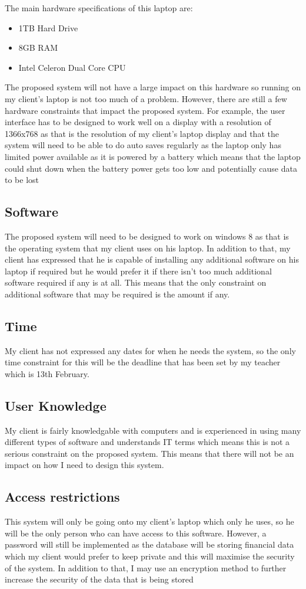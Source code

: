 The main hardware specifications of this laptop are:
\begin{itemize}
	\item 1TB Hard Drive
	\item 8GB RAM
	\item Intel Celeron Dual Core CPU
\end{itemize}
The proposed system will not have a large impact on this hardware so running on my client's laptop is not too much of a problem.
However, there are still a few hardware constraints that impact the proposed system. For example, the user interface has to be designed to work well on a display with a resolution of 1366x768 as that is the resolution of my client's laptop display and that the system will need to be able to do auto saves regularly as the laptop only has limited power available as it is powered by a battery which means that the laptop could shut down when the battery power gets too low and potentially cause data to be lost
\subsection{Software}
The proposed system will need to be designed to work on windows 8 as that is the operating system that my client uses on his laptop. In addition to that, my client has expressed that he is capable of installing any additional software on his laptop if required but he would prefer it if there isn't too much additional software required if any is at all. This means that the only constraint on additional software that may be required is the amount if any.
\subsection{Time}
My client has not expressed any dates for when he needs the system, so the only time constraint for this will be the deadline that has been set by my teacher which is 13th February.
\subsection{User Knowledge}
My client is fairly knowledgable with computers and is experienced in using many different types of software and understands IT terms which means this is not a serious constraint on the proposed system. This means that there will not be an impact on how I need to design this system.
\subsection{Access restrictions}
This system will only be going onto my client's laptop which only he uses, so he will be the only person who can have access to this software. However, a password will still be implemented as the database will be storing financial data which my client would prefer to keep private and this will maximise the security of the system. In addition to that, I may use an encryption method to further increase the security of the data that is being stored

